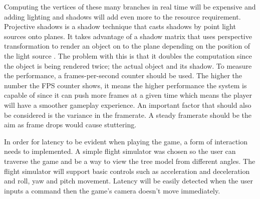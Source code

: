 Computing the vertices of these many branches in real time will be expensive and adding lighting and shadows will add even more to the resource requirement. Projective shadows is a shadow technique that casts shadows by point light sources onto planes. It takes advantage of a shadow matrix that uses perspective transformation to render an object on to the plane depending on the position of the light source \cite{hawkins2001opengl}. The problem with this is that it doubles the computation since the object is being rendered twice; the actual object and its shadow. To measure the performance, a frames-per-second counter should be used. The higher the number the FPS counter shows, it means the higher performance the system is capable of since it can push more frames at a given time which means the player will have a smoother gameplay experience. An important factor that should also be considered is the variance in the framerate. A steady framerate should be the aim as frame drops would cause stuttering.
\newline
\par
In order for latency to be evident when playing the game, a form of interaction needs to implemented. A simple flight simulator was chosen so the user can traverse the game and be a way to view the tree model from different angles. The flight simulator will support basic controls such as acceleration and deceleration and roll, yaw and pitch movement. Latency will be easily detected when the user inputs a command then the game's camera doesn't move immediately.

